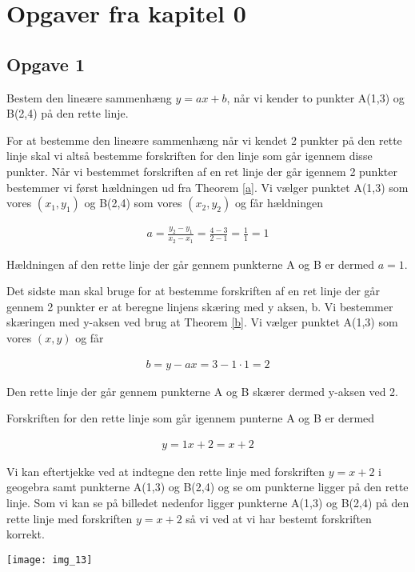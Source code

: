 \section{Opgaver fra kapitel 0}


\subsection{Opgave 1}
Bestem den lineære sammenhæng $y = ax + b$, når vi kender to punkter A(1,3) og B(2,4) på den rette linje.

For at bestemme den lineære sammenhæng når vi kendet 2 punkter på den rette linje skal vi altså bestemme forskriften for den linje som går igennem disse punkter. Når vi bestemmet forskriften af en ret linje der går igennem 2 punkter bestemmer vi først hældningen ud fra Theorem \ref{a}. Vi vælger punktet A(1,3) som vores $(x_1,y_1)$ og B(2,4) som vores $(x_2,y_2)$ og får hældningen

\begin{align*}
a = \frac{y_2-y_1}{x_2-x_1} = \frac{4-3}{2-1} = \frac{1}{1} = 1
\end{align*}

Hældningen af den rette linje der går gennem punkterne A og B er dermed $a = 1$.

Det sidste man skal bruge for at bestemme forskriften af en ret linje der går gennem 2 punkter er at beregne linjens skæring med y aksen, b. Vi bestemmer skæringen med y-aksen ved brug at Theorem \ref{b}. Vi vælger punktet A(1,3) som vores $(x,y)$ og får

\begin{align*}
b = y-ax = 3-1\cdot 1= 2 
\end{align*}

Den rette linje der går gennem punkterne A og B skærer dermed y-aksen ved 2.

Forskriften for den rette linje som går igennem punterne A og B er dermed

\begin{align*}
y = 1x + 2 = x + 2
\end{align*}

Vi kan eftertjekke ved at indtegne den rette linje med forskriften $y = x+2$ i geogebra samt punkterne A(1,3) og B(2,4) og se om punkterne ligger på den rette linje. Som vi kan se på billedet nedenfor ligger punkterne A(1,3) og B(2,4) på den rette linje med forskriften $y = x+2$ så vi ved at vi har bestemt forskriften korrekt.

\texttt{[image: img\_13]}

